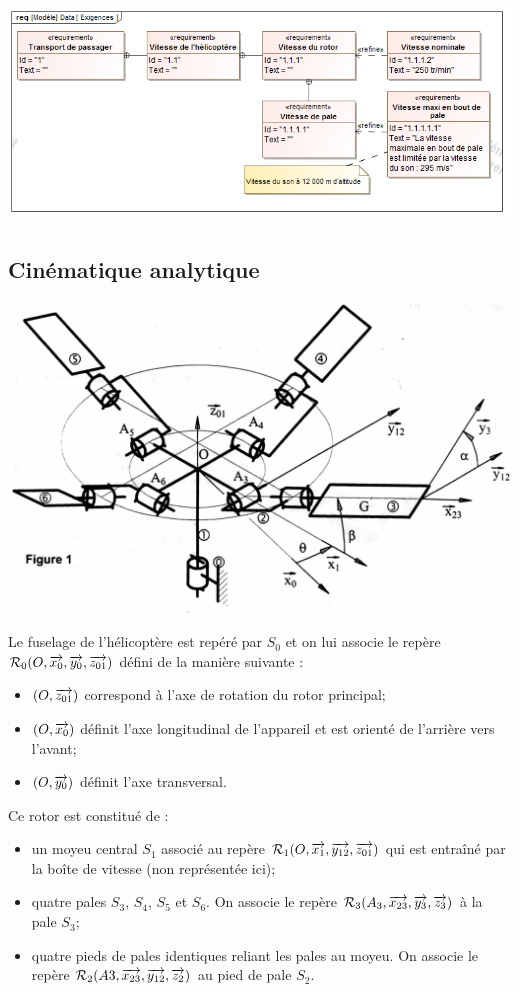 \documentclass[10pt,fleqn]{article} %
\begin{document}
\begin{multicols}{2}

\begin{center}
\includegraphics[width=\linewidth]{images/SysML/Exigences}
\end{center}
\fi
\subsection*{Cinématique analytique}
\ifprof
\else
\begin{center}
\includegraphics[width=.8\linewidth]{images/fig2}
\end{center}

Le fuselage de l'hélicoptère est repéré par $S_0$ et on lui associe le repère $\mathcal{R}_0(O,\overrightarrow{x_0},\overrightarrow{y_0},\overrightarrow{z_{01}})$ défini de la
manière suivante :
\begin{itemize}
\item $(O,\overrightarrow{z_{01}})$ correspond à l'axe de rotation du rotor principal;
\item $(O, \overrightarrow{x_0} )$ définit l'axe longitudinal de l'appareil et est orienté de l'arrière vers l'avant;
\item $(O, \overrightarrow{y_0} )$ définit l'axe transversal.
\end{itemize}

Ce rotor est constitué de :
\begin{itemize}
\item un moyeu central $S_1$ associé au repère $\mathcal{R}_1(O,\overrightarrow{x_1},\overrightarrow{y_{12}},\overrightarrow{z_{01}})$ qui est entraîné par la boîte de vitesse (non
représentée ici);
\item quatre pales $S_3$, $S_4$, $S_5$ et $S_6$. On associe le repère $\mathcal{R}_3(A_3,\overrightarrow{x_{23}},\overrightarrow{y_3},\overrightarrow{z_3} )$ à la pale $S_3$;
\item quatre pieds de pales identiques reliant les pales au moyeu. On associe le repère
$\mathcal{R}_2(A3,\overrightarrow{x_{23}},\overrightarrow{y_{12}},\overrightarrow{z_2} )$ au pied de pale $S_2$.
\end{itemize}


\end{multicols}
\end{document}
